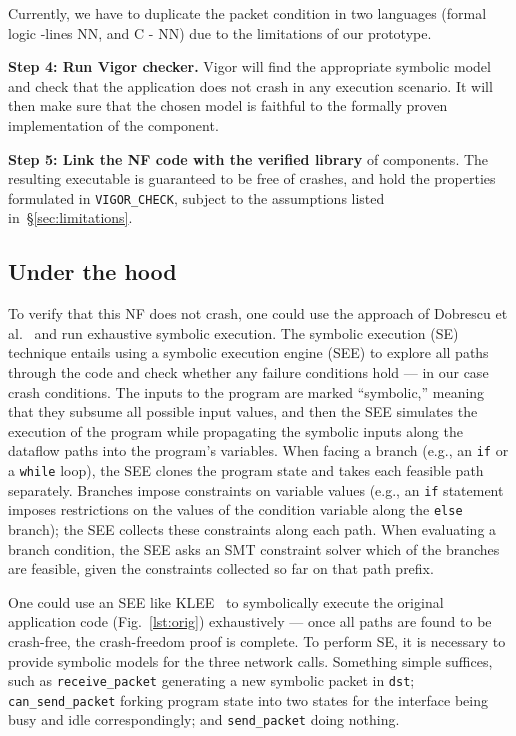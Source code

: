 \documentclass[letterpaper,twocolumn,10pt]{article}
\newcommand{\code}[1]{\lstinline{#1}}
\begin{document}
Currently, we have to duplicate the packet condition in two languages (formal
logic -lines NN, and C - NN) due to the limitations of our prototype.

{\bf Step 4: Run Vigor checker.} Vigor will find the appropriate symbolic model
and check that the application does not crash in any execution scenario. It will
then make sure that the chosen model is faithful to the formally proven
implementation of the component.

{\bf Step 5: Link the NF code with the verified library} of components. The
resulting executable is guaranteed to be free of crashes, and hold the
properties formulated in \code{VIGOR_CHECK}, subject to the assumptions listed
in~\S\ref{sec:limitations}.

\subsection{Under the hood}


To verify that this NF does not crash, one could use the approach of Dobrescu et
al.~\cite{dobrescu2014software} and run exhaustive symbolic execution. The
symbolic execution (SE) technique entails using a symbolic execution engine
(SEE) to explore all paths through the code and check whether any failure
conditions hold --- in our case crash conditions. The inputs to the program are
marked ``symbolic,'' meaning that they subsume all possible input values, and
then the SEE simulates the execution of the program while propagating the
symbolic inputs along the dataflow paths into the program's variables. When
facing a branch (e.g., an \code{if} or a \code{while} loop), the SEE clones the
program state and takes each feasible path separately. Branches impose
constraints on variable values (e.g., an \code{if} statement imposes
restrictions on the values of the condition variable along the \code{else}
branch); the SEE collects these constraints along each path. When evaluating a
branch condition, the SEE asks an SMT constraint solver which of the branches
are feasible, given the constraints collected so far on that path prefix.

One could use an SEE like KLEE~\cite{cadar2008klee} to symbolically execute the
original application code (Fig.~\ref{lst:orig}) exhaustively --- once all paths
are found to be crash-free, the crash-freedom proof is complete. To perform SE,
it is necessary to provide symbolic models for the three network calls.
Something simple suffices, such as \code{receive_packet} generating a new
symbolic packet in \code{dst}; \code{can_send_packet} forking program state into
two states for the interface being busy and idle correspondingly; and
\code{send_packet} doing nothing.
\end{document}
